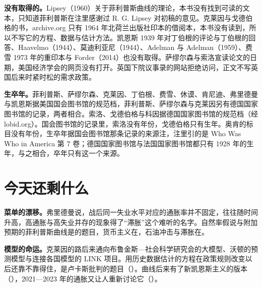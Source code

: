 \begin{deeper}[史料说明]
\textbf{没有取得的。}Lipsey（1960）关于菲利普斯曲线的理论，本书没有找到可读的文本，只知道菲利普斯在注里感谢过 R. G. Lipsey 对初稿的意见。克莱因与戈德伯格的书，archive.org 只有 1964 年北荷兰出版社印本的借阅本\cite{archivekg38}，本书没有读到，所以不写它的方程、数据与估计方法。凯恩斯 1939 年对丁伯根的评论与丁伯根的回答、Haavelmo（1944）、莫迪利亚尼（1944）、Adelman 与 Adelman（1959）、费雪 1973 年的重印本与 Forder（2014）也没有取得。萨缪尔森与索洛宣读论文的日期，美国经济学会的网页没有打开。英国下院议事录的网站拒绝访问，正文不写英国后来时紧时松的需求政策。

\textbf{生卒年。}菲利普斯、萨缪尔森、克莱因、丁伯根、费雪、休谟、肯尼迪、弗里德曼与凯恩斯据美国国会图书馆的规范档，菲利普斯、萨缪尔森与克莱因另有德国国家图书馆的记录，两者相合。索洛、戈德伯格与科因据德国国家图书馆的规范档（经 lobid.org）。国会图书馆的记录里，索洛没有年份，戈德伯格只有生年。奥肯的标目没有年份，生卒年据国会图书馆那条记录的来源注，注里引的是 Who Was Who in America 第 7 卷；德国国家图书馆与法国国家图书馆都只有 1928 年的生年，与之相合，卒年只有这一个来源\cite{loc38,gnd38}。
\end{deeper}

\section{今天还剩什么}\label{sec:phillips-legacy}

\textbf{菜单的漂移。}弗里德曼说，战后同一失业水平对应的通胀率并不固定，往往随时间升高，高通胀与高失业并存的现象得了“滞胀”这个难听的名字\cite{friedman1976}。自然率假说与附加预期的菲利普斯曲线是的题目，货币主义在，石油冲击与滞胀在。

\textbf{模型的命运。}克莱因的路后来通向布鲁金斯—社会科学研究会的大模型、沃顿的预测模型与连接各国模型的 LINK 项目\cite{nobel1980}。用历史数据估计的方程在政策规则改变以后还靠不靠得住，是卢卡斯批判的题目（）。曲线后来有了新凯恩斯主义的版本（），2021—2023 年的通胀又让人重新讨论它（）。


